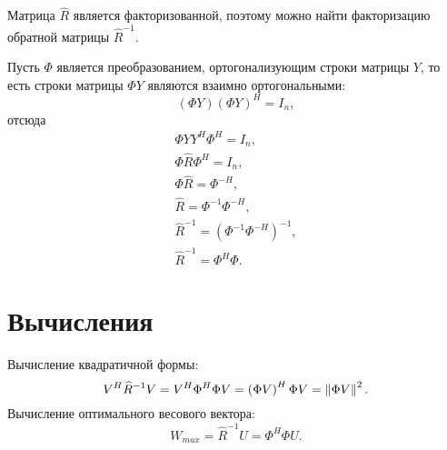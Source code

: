 Матрица $\widehat{R}$ является факторизованной, поэтому можно найти факторизацию обратной матрицы $\widehat{R}^{-1}$.

Пусть $\Phi$ является преобразованием, ортогонализующим строки матрицы $Y$, то есть строки матрицы $\Phi Y$ являются взаимно ортогональными:
\[
    \left ( \Phi Y \right ) \left ( \Phi Y \right )^H = I_n ,
\]
отсюда
\begin{gather*}
    \Phi Y Y^H \Phi^H = I_n , \\
    \Phi \widehat{R} \Phi^H = I_n , \\
    \Phi \widehat{R} = \Phi^{-H}, \\
    \widehat{R} = \Phi^{-1} \Phi^{-H}, \\
    \widehat{R}^{-1} = \left ( \Phi^{-1} \Phi^{-H} \right )^{-1}, \\
    \widehat{R}^{-1} = \Phi^H \Phi .
\end{gather*}

\section{Вычисления}

Вычисление квадратичной формы:
\[
    V^H \widehat{R}^{-1} V
    = V^H \Phi^H \Phi V
    = \left ( \Phi V \right )^H \Phi V
    = \left \| \Phi V \right \|^2 .
\]
Вычисление оптимального весового вектора:
\[
    W_{max}
    = \widehat{R}^{-1} U
    = \Phi^H \Phi U .
\]